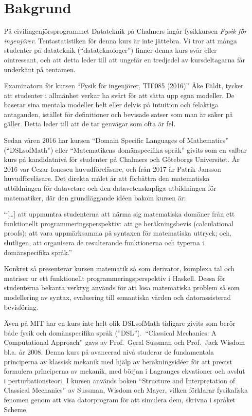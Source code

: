\chapter{Bakgrund}
På civilingenjörsprogrammet Datateknik på Chalmers ingår fysikkursen
\textit{Fysik för ingenjörer}. Tentastatistiken för denna kurs är
inte jättebra\cite{tentastatistik}. Vi
tror att många studenter på datateknik (``datateknologer'') finner denna kurs
svår eller ointressant, och att detta leder till att ungefär en
tredjedel av kursdeltagarna får underkänt på tentamen.

Examinatorn för kursen ``Fysik för ingenjörer, TIF085 (2016)'' Åke Fäldt, tycker
att studenter i allmänhet verkar ha svårt för att sätta upp egna
modeller. De baserar sina mentala modeller helt eller delvis på
intuition och felaktiga antaganden, istället för definitioner och
bevisade satser som man är säker på gäller. Detta leder till att de
tar genvägar som ofta är fel.

Sedan våren 2016 har kursen ``Domain Specific Languages of
Mathematics'' (``DSLsofMath'') eller ``Matematikens domänspecifika språk''
givits som en valbar kurs på kandidatnivå för studenter på Chalmers och
Göteborgs Universitet. År 2016 var Cezar Ionescu huvudföreläsare, och från 2017
är Patrik Jansson huvudföreläsare. Det direkta målet är att förbättra den
matematiska utbildningen för datavetare och den datavetenskapliga utbildningen
för matematiker, där den grundläggande idéen bakom kursen är: 

\begin{center}
  ``[\dots] att uppmuntra studenterna att närma sig matematiska domäner från ett
  funktionellt programmeringsperspektiv: att ge beräkningsbevis (calculational
  proofs); att vara uppmärksamma på syntaxen för matematiska uttryck; och,
  slutligen, att organisera de resulterande funktionerna och typerna i
  domänspecifika språk.''\cite{lecture-notes}\cite{tfpie2015} 
\end{center}

Konkret så presenterar kursen matematik så som derivator, komplexa
tal och matriser ur ett funktionellt programmeringsperspektiv i
Haskell. Dessa för studenterna bekanta verktyg används för att lösa
matematiska problem så som modellering av syntax, evaluering till
semantiska värden och datorassisterad bevisföring.

Även på MIT har en kurs inte helt olik DSLsofMath tidigare givits som berör både
fysik och domänspecifika språk (''DSL'').\ ``Classical Mechanics: A Computational Approach'' gavs av
Prof.\ Geral Sussman och Prof.\ Jack Wisdom bl.a. år
2008.\cite{classical-mechanics-course-mit-2008}
Denna kurs på avancerad nivå studerar de fundamentala principerna av klassisk
mekanik med hjälp av beräkningsidéer för att precist formulera principerna av
mekanik, med början i Lagranges ekvationer och avslut i
perturbationsteori. I kursen används boken ``Structure and
Interpretation of Classical Mechanics'' av Sussman, Wisdom och Mayer,
vilken förklarar fysikaliska fenomen genom att visa datorprogram för att
simulera dem, skrivna i språket Scheme.\cite{SICM}

